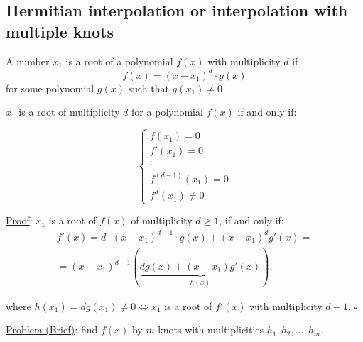 \subsection*{Hermitian interpolation or interpolation with multiple knots}
\begin{definition}{}{}
    A number $x_1$ is a root of a polynomial $f(x)$  with multiplicity $d$ if
    \[
        f(x) = (x-x_1)^d\cdot g(x)  
    \]
    for some polynomial $g(x)$ such that $g(x_1) \neq 0$
\end{definition}
\begin{lemma}{}{}
    $x_1$ is a root of multiplicity $d$ for a polynomial $f(x)$ if and only if:
    \vspace*{0.25cm}

    \begin{minipage}[c]{0.2\linewidth}
    \[
            \left\{
                \begin{array}{c}
                    f(x_1) = 0\\
                    f'(x_1) = 0\\
                    \vdots \\
                    f^{(d-1)}(x_1) = 0\\
                    f^d(x_1) \neq 0
                \end{array}
            \right.
    \]     
    \end{minipage}
    \hspace*{1cm} 
    \begin{minipage}[c]{0.8\linewidth}
        \underline{Proof}: \hspace*{0.3cm} 
            $x_1$ is a root of $f(x)$ of multiplicity $d \geq 1$, if and only if: \[
                \begin{array}{c}
                    f'(x) = d\cdot (x-x_1)^{d-1}\cdot g(x) + (x-x_1)^{d}g'(x) = \\
                    = (x-x_1)^{d-1} (\underbrace{dg(x) + (x-x_1)g'(x)}_{h(x)}),
                \end{array}
                \] \vspace*{-0.25cm}

                where $h(x_1) = dg(x_1) \neq 0 \Leftrightarrow x_1$ is a root of $f'(x)$ with multiplicity $d-1$. $\square$
    \end{minipage}
\end{lemma}
\underline{Problem (Brief)}: find $f(x)$ by $m$ knots with multiplicities $h_1, h_2, \ldots, h_m$. \vspace*{0.25cm}


